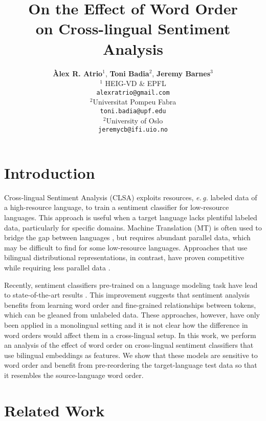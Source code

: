 \documentclass[a4paper,11pt,twocolumn,twoside]{article}
\title{On the Effect of Word Order\\on Cross-lingual Sentiment Analysis}
\author {\textbf{Àlex R. Atrio$^1$}, \textbf{Toni Badia$^{2}$}, \textbf{Jeremy Barnes$^{3}$}\\[5pt]
$^1$ HEIG-VD \& EPFL\\ %
[1pt]{\tt alexratrio@gmail.com} \\[5pt]
$^2$Universitat Pompeu Fabra\\
[1pt]{\tt toni.badia@upf.edu} \\[5pt]
$^2$University of Oslo\\
{\tt jeremycb@ifi.uio.no}
}
\newcommand{\eg}{\textit{e.\,g.}\xspace}
\begin{document}

\setlength\titlebox{16cm} %


\label{firstpage} \maketitle

%


\section{Introduction}


Cross-lingual Sentiment Analysis (CLSA) exploits resources, \eg labeled data of a high-resource language, to train a sentiment classifier for low-resource languages. This approach is useful when a target language lacks plentiful labeled data, particularly for specific domains. Machine Translation (MT) is often used to bridge the gap between languages \cite{Banea2008,Balahur2014d}, but requires abundant parallel data, which may be difficult to find for some low-resource languages. Approaches that use bilingual distributional representations, in contrast, have proven competitive while requiring less parallel data \cite{Chen2016,Barnes2018b}.

Recently, sentiment classifiers pre-trained on a language modeling task have lead to state-of-the-art results \cite{Peters2018,Howard2018,Devlin2018}. This improvement suggests that sentiment analysis benefits from learning word order and fine-grained relationships between tokens, which can be gleaned from unlabeled data. These approaches, however, have only been applied in a monolingual setting and it is not clear how the difference in word orders would affect them in a cross-lingual setup. In this work, we perform an analysis of the effect of word order on cross-lingual sentiment classifiers that use bilingual embeddings as features. We show that these models are sensitive to word order and benefit from pre-reordering the target-language test data so that it resembles the source-language word order.


\section{Related Work}
\end{document}
